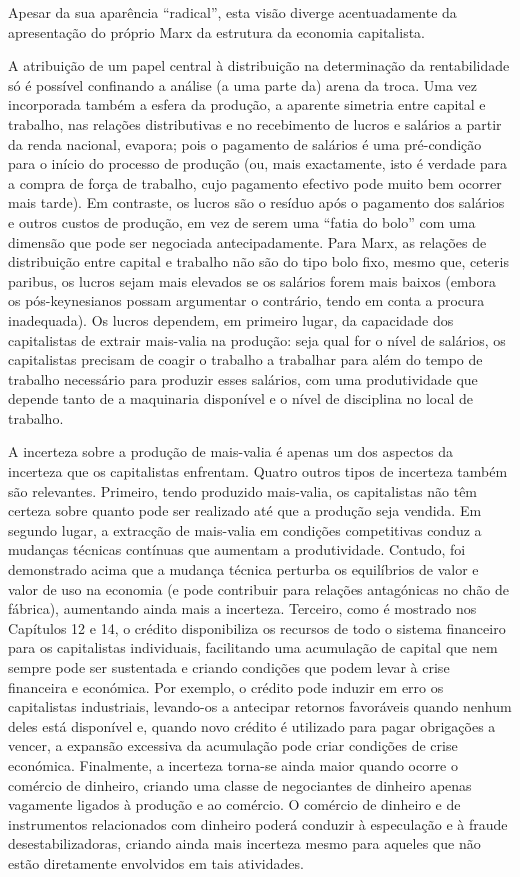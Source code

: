  \par 
Apesar da sua aparência “radical”, esta visão diverge acentuadamente da apresentação do próprio Marx da estrutura da economia capitalista.
 \par 
A atribuição de um papel central à distribuição na determinação da rentabilidade só é possível confinando a análise (a uma parte da) arena da troca. Uma vez incorporada também a esfera da produção, a aparente simetria entre capital e trabalho, nas relações distributivas e no recebimento de lucros e salários a partir da renda nacional, evapora; pois o pagamento de salários é uma pré-condição para o início do processo de produção (ou, mais exactamente, isto é verdade para a compra de força de trabalho, cujo pagamento efectivo pode muito bem ocorrer mais tarde). Em contraste, os lucros são o resíduo após o pagamento dos salários e outros custos de produção, em vez de serem uma “fatia do bolo” com uma dimensão que pode ser negociada antecipadamente. Para Marx, as relações de distribuição entre capital e trabalho não são do tipo bolo fixo, mesmo que, ceteris paribus, os lucros sejam mais elevados se os salários forem mais baixos (embora os pós-keynesianos possam argumentar o contrário, tendo em conta a procura inadequada). Os lucros dependem, em primeiro lugar, da capacidade dos capitalistas de extrair mais-valia na produção: seja qual for o nível de salários, os capitalistas precisam de coagir o trabalho a trabalhar para além do tempo de trabalho necessário para produzir esses salários, com uma produtividade que depende tanto de a maquinaria disponível e o nível de disciplina no local de trabalho.
 \par 
A incerteza sobre a produção de mais-valia é apenas um dos aspectos da incerteza que os capitalistas enfrentam. Quatro outros tipos de incerteza também são relevantes. Primeiro, tendo produzido mais-valia, os capitalistas não têm certeza sobre quanto pode ser realizado até que a produção seja vendida. Em segundo lugar, a extracção de mais-valia em condições competitivas conduz a mudanças técnicas contínuas que aumentam a produtividade. Contudo, foi demonstrado acima que a mudança técnica perturba os equilíbrios de valor e valor de uso na economia (e pode contribuir para relações antagónicas no chão de fábrica), aumentando ainda mais a incerteza. Terceiro, como é mostrado nos Capítulos {\color{blue}12} e 14, o crédito disponibiliza os recursos de todo o sistema financeiro para os capitalistas individuais, facilitando uma acumulação de capital que nem sempre pode ser sustentada e criando condições que podem levar à crise financeira e económica. Por exemplo, o crédito pode induzir em erro os capitalistas industriais, levando-os a antecipar retornos favoráveis ​​quando nenhum deles está disponível e, quando novo crédito é utilizado para pagar obrigações a vencer, a expansão excessiva da acumulação pode criar condições de crise económica. Finalmente, a incerteza torna-se ainda maior quando ocorre o comércio de dinheiro, criando uma classe de negociantes de dinheiro apenas vagamente ligados à produção e ao comércio. O comércio de dinheiro e de instrumentos relacionados com dinheiro poderá conduzir à especulação e à fraude desestabilizadoras, criando ainda mais incerteza mesmo para aqueles que não estão diretamente envolvidos em tais atividades.
